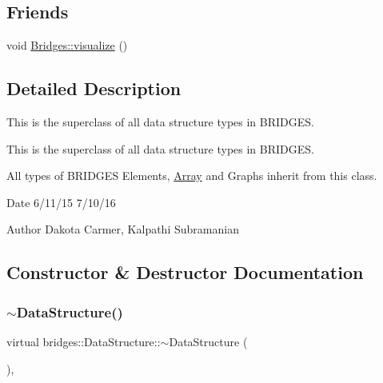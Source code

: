 \subsection*{Friends}
\begin{DoxyCompactItemize}
\item 
void \mbox{\hyperlink{classbridges_1_1_data_structure_a0a9e3be9faab475909293766dcda4779}{Bridges\+::visualize}} ()
\end{DoxyCompactItemize}


\subsection{Detailed Description}
This is the superclass of all data structure types in B\+R\+I\+D\+G\+ES. 

This is the superclass of all data structure types in B\+R\+I\+D\+G\+ES.

All types of B\+R\+I\+D\+G\+ES Elements, \mbox{\hyperlink{classbridges_1_1_array}{Array}} and Graphs inherit from this class.

\begin{DoxyDate}{Date}
6/11/15 7/10/16 
\end{DoxyDate}
\begin{DoxyAuthor}{Author}
Dakota Carmer, Kalpathi Subramanian 
\end{DoxyAuthor}


\subsection{Constructor \& Destructor Documentation}
\mbox{\label{classbridges_1_1_data_structure_afd70a1ae5c2578d80a441714f95f9401}} 
\subsubsection{\texorpdfstring{$\sim$\+Data\+Structure()}{~DataStructure()}}
{\footnotesize\ttfamily virtual bridges\+::\+Data\+Structure\+::$\sim$\+Data\+Structure (\begin{DoxyParamCaption}{ }\end{DoxyParamCaption})\hspace{0.3cm}{\ttfamily [virtual]}, {\ttfamily [default]}}

